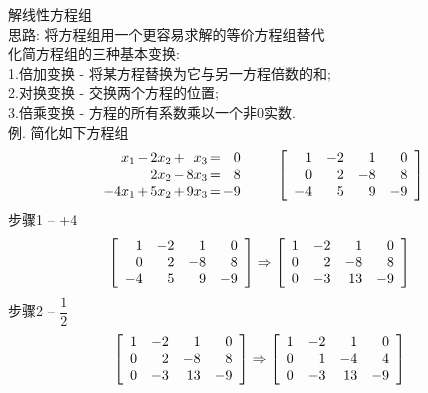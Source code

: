 \documentclass[UTF8,fontset=ubuntu]{ctexart}
\theoremstyle{nonumberplain}
\theoremstyle{break}
\theoremstyle{empty}
\begin{document}
解线性方程组\\
思路: 将方程组用一个更容易求解的等价方程组替代\\

化简方程组的三种基本变换:\\
1.倍加变换 - 将某方程替换为它与另一方程倍数的和;\\
2.对换变换 - 交换两个方程的位置;\\
3.倍乘变换 - 方程的所有系数乘以一个非0实数.\\

例. 简化如下方程组
\[\begin{array}{r@{\hspace{1.5pt}}l@{\hspace{1.5pt}}r@{\hspace{1.5pt}}l@{\hspace{1.5pt}}r@{\hspace{1.5pt}}l@{\hspace{1.5pt}}r}
x_1 & - & 2x_2 & + &  x_3 & = & 0\\
	& 	& 2x_2 & - & 8x_3 & = & 8\\
-4x_1 & + & 5x_2 & + & 9x_3 & = & -9
\end{array}\qquad\left[\begin{array}{r r r r}
	1 & -2 & 1 & 0\\
	0 & 2 & -8 & 8\\
	-4 & 5 & 9 & -9
\end{array}\right]\]
步骤1 -- +4
\[\left[\begin{array}{r r r r}
    1 & -2 & 1 & 0\\
    0 & 2 & -8 & 8\\
    -4 & 5 & 9 & -9
\end{array}\right] \Rightarrow \left[\begin{array}{r r r r}
    1 & -2 & 1 & 0\\
    0 & 2 & -8 & 8\\
    0 & -3 & 13 & -9
\end{array}\right]\]
步骤2 -- $\dfrac{1}{2}$
\[\left[\begin{array}{r r r r}
    1 & -2 & 1 & 0\\
    0 & 2 & -8 & 8\\
    0 & -3 & 13 & -9
\end{array}\right] \Rightarrow \left[\begin{array}{r r r r}
    1 & -2 & 1 & 0\\
    0 & 1 & -4 & 4\\
    0 & -3 & 13 & -9
\end{array}\right]\]
\end{document}

